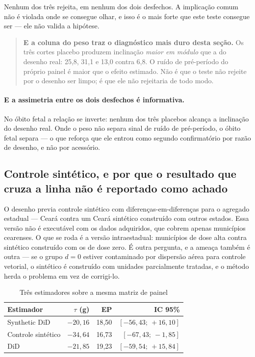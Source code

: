 Nenhum dos três rejeita, em nenhum dos dois desfechos. A implicação comum não é
violada onde se consegue olhar, e isso é o mais forte que este teste consegue
ser --- ele não valida a hipótese.

\begin{quote}
\textbf{E a coluna do peso traz o diagnóstico mais duro desta seção.} Os três
cortes placebo produzem inclinação \emph{maior em módulo} que a do desenho real:
25,8, 31,1 e 13,0 contra 6,8. O ruído de pré-período do próprio painel é maior
que o efeito estimado. Não é que o teste não rejeite por o desenho ser limpo; é
que ele não rejeitaria de todo modo.
\end{quote}

\paragraph{E a assimetria entre os dois desfechos é informativa.}
No óbito fetal a relação se inverte: nenhum dos três placebos alcança a
inclinação do desenho real. Onde o peso não separa sinal de ruído de
pré-período, o óbito fetal separa --- o que reforça que ele entrou como segundo
confirmatório por razão de desenho, e não por acessório.

\subsection{Controle sintético, e por que o resultado que cruza a linha não é
reportado como achado}
\label{sub:sdid}

O desenho previa controle sintético com diferenças-em-diferenças
\citep{arkhangelsky2021sdid} para o agregado estadual --- Ceará contra um Ceará
sintético construído com outros estados. Essa versão não é executável com os
dados adquiridos, que cobrem apenas municípios cearenses. O que se roda é a
versão intraestadual: municípios de dose alta contra sintético construído com os
de dose zero. É outra pergunta, e a ameaça também é outra --- se o grupo \(d=0\)
estiver contaminado por dispersão aérea para controle vetorial, o sintético é
construído com unidades parcialmente tratadas, e o método herda o problema em
vez de corrigi-lo.

\begin{table}[htbp]
\centering
\caption{Três estimadores sobre a mesma matriz de painel}
\label{tab:sdid}
\small
\begin{tabular}{lrrr}
\toprule
\textbf{Estimador} & \textbf{\(\tau\) (g)} & \textbf{EP} & \textbf{IC 95\%} \\
\midrule
Synthetic DiD       & \(-20{,}16\) & 18{,}50 & \([-56{,}43;\ +16{,}10]\) \\
Controle sintético  & \(-34{,}64\) & 16{,}73 & \([-67{,}43;\ -1{,}85]\) \\
DiD                 & \(-21{,}85\) & 19{,}23 & \([-59{,}54;\ +15{,}84]\) \\
\bottomrule
\end{tabular}
\end{table}

